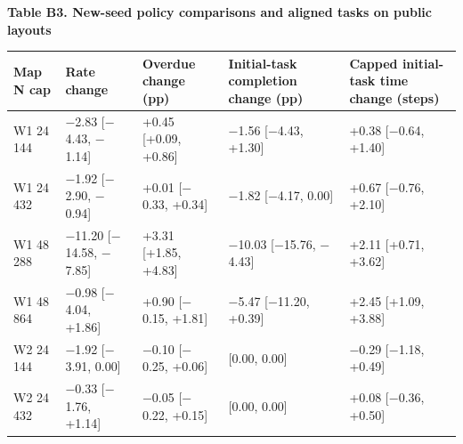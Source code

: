 \documentclass{article}
\begin{document}
\par\medskip\noindent\begin{minipage}{\linewidth}
\small\hypertarget{display:TableB3}{}\textbf{Table B3. New-seed policy comparisons and aligned tasks on public layouts}\par\smallskip
\setlength{\tabcolsep}{4pt}\renewcommand{\arraystretch}{1.12}
\begin{tabular}{@{}>{\raggedright\arraybackslash}p{}>{\raggedright\arraybackslash}p{}>{\raggedright\arraybackslash}p{}>{\raggedright\arraybackslash}p{}>{\raggedright\arraybackslash}p{}@{}}
\toprule
\textbf{Map \textperiodcentered{} N \textperiodcentered{} cap} & \textbf{Rate change} & \textbf{Overdue change (pp)} & \textbf{Initial-task completion change (pp)} & \textbf{Capped initial-task time change (steps)} \\
\midrule
W1 \textperiodcentered{} 24 \textperiodcentered{} 144 & \ensuremath{-}2.83 [\ensuremath{-}4.43, \ensuremath{-}1.14] & +0.45 [+0.09, +0.86] & \ensuremath{-}1.56 [\ensuremath{-}4.43, +1.30] & +0.38 [\ensuremath{-}0.64, +1.40] \\
W1 \textperiodcentered{} 24 \textperiodcentered{} 432 & \ensuremath{-}1.92 [\ensuremath{-}2.90, \ensuremath{-}0.94] & +0.01 [\ensuremath{-}0.33, +0.34] & \ensuremath{-}1.82 [\ensuremath{-}4.17, 0.00] & +0.67 [\ensuremath{-}0.76, +2.10] \\
W1 \textperiodcentered{} 48 \textperiodcentered{} 288 & \ensuremath{-}11.20 [\ensuremath{-}14.58, \ensuremath{-}7.85] & +3.31 [+1.85, +4.83] & \ensuremath{-}10.03 [\ensuremath{-}15.76, \ensuremath{-}4.43] & +2.11 [+0.71, +3.62] \\
W1 \textperiodcentered{} 48 \textperiodcentered{} 864 & \ensuremath{-}0.98 [\ensuremath{-}4.04, +1.86] & +0.90 [\ensuremath{-}0.15, +1.81] & \ensuremath{-}5.47 [\ensuremath{-}11.20, +0.39] & +2.45 [+1.09, +3.88] \\
W2 \textperiodcentered{} 24 \textperiodcentered{} 144 & \ensuremath{-}1.92 [\ensuremath{-}3.91, 0.00] & \ensuremath{-}0.10 [\ensuremath{-}0.25, +0.06] & 0.00 [0.00, 0.00] & \ensuremath{-}0.29 [\ensuremath{-}1.18, +0.49] \\
W2 \textperiodcentered{} 24 \textperiodcentered{} 432 & \ensuremath{-}0.33 [\ensuremath{-}1.76, +1.14] & \ensuremath{-}0.05 [\ensuremath{-}0.22, +0.15] & 0.00 [0.00, 0.00] & +0.08 [\ensuremath{-}0.36, +0.50] \\

\end{tabular}
\end{minipage}
\end{document}
